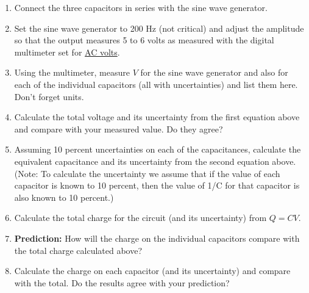\begin{enumerate}
\item Connect the three capacitors in series with the sine wave generator.
\item Set the sine wave generator to 200 Hz (not critical) and adjust the
amplitude so that the output measures 5 to 6 volts as measured with the
digital multimeter set for \underline{AC volts}.
\item Using the multimeter, measure $V$ for the sine wave generator and also
for each of the individual capacitors (all with uncertainties) and
list them here. Don't forget units.\vspace{20mm}

\item Calculate the total voltage and its uncertainty from the first equation
above and compare with your measured value.  Do they agree?\vspace{30mm}

\item Assuming 10 percent uncertainties on each of the capacitances,
calculate the equivalent capacitance and its uncertainty from the second
equation above. (Note: To calculate the uncertainty we assume that if the value
 of each capacitor is known to 10 percent, then the value of 1/C for 
that capacitor is also known to 10 percent.) \vspace{45mm}

\item Calculate the total charge for the circuit (and its uncertainty) from
$Q = CV$.\vspace{30mm}

\item \textbf{Prediction:} How will the charge on the individual capacitors
compare with the total charge calculated above?\vspace{15mm}

\item Calculate the charge on each capacitor (and its uncertainty) and compare 
with the total. Do the results agree with your prediction?
\end{enumerate}

